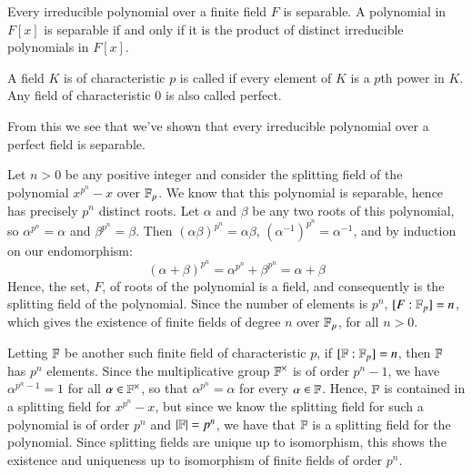 \begin{proposition}
    Every irreducible polynomial over a finite field $F$ is separable. A polynomial in $F[x]$ is separable if and only if it is the product of distinct irreducible polynomials in $F[x]$.
\end{proposition}

\begin{definition}
    A field $K$ is of characteristic $p$ is called  if every element of $K$ is a $p$th power in $K$. Any field of characteristic $0$ is also called perfect.
\end{definition}

From this we see that we've shown that every irreducible polynomial over a perfect field is separable.


\begin{example}
    Let $n > 0$ be any positive integer and consider the splitting field of the polynomial $x^{p^n}-x$ over $\mathbb F_p$. We know that this polynomial is separable, hence has precisely $p^n$ distinct roots. Let $\alpha$ and $\beta$ be any two roots of this polynomial, so $\alpha^{p^n} = \alpha$ and $\beta^{p^n} = \beta$. Then $(\alpha\beta)^{p^n} = \alpha\beta$, $(\alpha^{-1})^{p^n} = \alpha^{-1}$, and by induction on our endomorphism: \begin{equation*}
        (\alpha+\beta)^{p^n} = \alpha^{p^n}+\beta^{p^n} = \alpha+\beta
    \end{equation*}
    Hence, the set, $F$, of roots of the polynomial is a field, and consequently is the splitting field of the polynomial. Since the number of elements is $p^n$, $[F:\mathbb F_p] = n$, which gives the existence of finite fields of degree $n$ over $\mathbb F_p$, for all $n > 0$.

    Letting $\mathbb F$ be another such finite field of characteristic $p$, if $[\mathbb F:\mathbb F_p] = n$, then $\mathbb F$ has $p^n$ elements. Since the multiplicative group $\mathbb F^{\times}$ is of order $p^n-1$, we have $\alpha^{p^n-1} = 1$ for all $\alpha \in \mathbb F^{\times}$, so that $\alpha^{p^n} = \alpha$ for every $\alpha \in \mathbb F$. Hence, $\mathbb F$ is contained in a splitting field for $x^{p^n}-x$, but since we know the splitting field for such a polynomial is of order $p^n$ and $|\mathbb F| = p^n$, we have that $\mathbb F$ is a splitting field for the polynomial. Since splitting fields are unique up to isomorphism, this shows the existence and uniqueness up to isomorphism of finite fields of order $p^n$.
\end{example}

